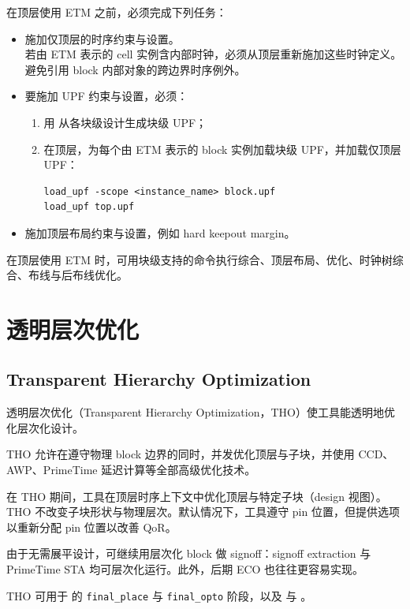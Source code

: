 在顶层使用 ETM 之前，必须完成下列任务：
\begin{itemize}
  \item 施加仅顶层的时序约束与设置。\\
若由 ETM 表示的 cell 实例含内部时钟，必须从顶层重新施加这些时钟定义。避免引用 block 内部对象的跨边界时序例外。

  \item 要施加 UPF 约束与设置，必须：
  \begin{enumerate}
    \item 用  从各块级设计生成块级 UPF；
    \item 在顶层，为每个由 ETM 表示的 block 实例加载块级 UPF，并加载仅顶层 UPF：
\begin{lstlisting}
load_upf -scope <instance_name> block.upf
load_upf top.upf
\end{lstlisting}
  \end{enumerate}

  \item 施加顶层布局约束与设置，例如 hard keepout margin。
\end{itemize}

在顶层使用 ETM 时，可用块级支持的命令执行综合、顶层布局、优化、时钟树综合、布线与后布线优化。

\section{透明层次优化}
\subsection*{Transparent Hierarchy Optimization}

透明层次优化（Transparent Hierarchy Optimization，THO）使工具能透明地优化层次化设计。

THO 允许在遵守物理 block 边界的同时，并发优化顶层与子块，并使用 CCD、AWP、PrimeTime 延迟计算等全部高级优化技术。

在 THO 期间，工具在顶层时序上下文中优化顶层与特定子块（design 视图）。THO 不改变子块形状与物理层次。默认情况下，工具遵守 pin 位置，但提供选项以重新分配 pin 位置以改善 QoR。

由于无需展平设计，可继续用层次化 block 做 signoff：signoff extraction 与 PrimeTime STA 均可层次化运行。此外，后期 ECO 也往往更容易实现。

THO 可用于  的 \texttt{final\_place} 与 \texttt{final\_opto} 阶段，以及  与 。

